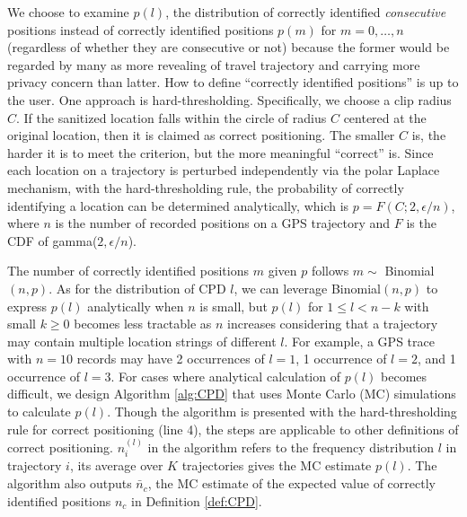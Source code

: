 \documentclass[10pt,journal,compsoc]{IEEEtran}
\begin{document}
We choose to examine $p(l)$, the  distribution of correctly identified  \emph{consecutive} positions instead of correctly identified positions $p(m)$ for $m=0,\ldots,n$ (regardless of whether they are consecutive or not) because the former  would be regarded by many as more revealing of travel trajectory and carrying more privacy concern than latter. How to define ``correctly identified positions'' is up to the user.  One approach is hard-thresholding. Specifically, we choose a clip radius $C$. If the sanitized location falls within the circle of radius $C$  centered at the original location, then it is claimed as correct positioning. The smaller $C$ is, the harder it is to meet the criterion, but the more meaningful ``correct'' is. Since each location on a trajectory is perturbed independently via the polar Laplace mechanism, with the hard-thresholding rule, the probability of correctly identifying a location can be determined analytically, which is $p=F(C;2,\epsilon/n)$, where $n$ is the number of recorded positions on a GPS trajectory and $F$ is the CDF of gamma($2,\epsilon/n$). 

The number of correctly identified positions $m$ given $p$ follows $m\sim$ Binomial$(n,p)$. As for the distribution of CPD $l$, we can leverage Binomial$(n,p)$ to express $p(l)$ analytically when $n$ is small, but $p(l)$ for $1\le l< n-k$ with small $k\ge0$ becomes less tractable as $n$ increases considering that a trajectory may contain multiple location strings of different $l$. For example, a GPS trace with $n=10$ records may have 2 occurrences of $l=1$, 1  occurrence of $l=2$, and 1  occurrence of $l=3$. For cases where analytical calculation of $p(l)$ becomes difficult, we design Algorithm \ref{alg:CPD} that uses Monte Carlo (MC) simulations to calculate $p(l)$. Though the algorithm is presented with the hard-thresholding rule for correct positioning (line 4), the steps are applicable to other definitions of correct positioning. $n_i^{(l)}$ in the algorithm  refers to the frequency distribution $l$ in trajectory $i$, its average over $K$ trajectories gives the MC estimate $p(l)$. The algorithm also outputs $\bar{n}_c$, the MC estimate of the expected  value  of  correctly identified positions $n_c$ in Definition \ref{def:CPD}.
\end{document}
